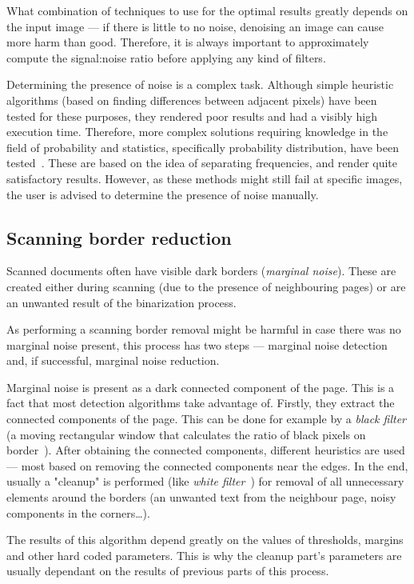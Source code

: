 What combination of techniques to use for the optimal results greatly depends on the input image --- if there is little to no noise, denoising an image can cause more harm than good. Therefore, it is always important to approximately compute the signal:noise ratio before applying any kind of filters.

Determining the presence of noise is a complex task. Although simple heuristic algorithms (based on finding differences between adjacent pixels) have been tested for these purposes, they rendered poor results and had a visibly high execution time. Therefore, more complex solutions requiring knowledge in the field of probability and statistics, specifically probability distribution, have been tested~\citep{noiseDetection}. These are based on the idea of separating frequencies, and render quite satisfactory results. However, as these methods might still fail at specific images, the user is advised to determine the presence of noise manually.

\subsection{Scanning border reduction}

Scanned documents often have visible dark borders (\emph{marginal noise}). These are created either during scanning (due to the presence of neighbouring pages) or are an unwanted result of the binarization process.

As performing a scanning border removal might be harmful in case there was no marginal noise present, this process has two steps --- marginal noise detection and, if successful, marginal noise reduction.

Marginal noise is present as a dark connected component of the page. This is a fact that most detection algorithms take advantage of. Firstly, they extract the connected components of the page. This can be done for example by a \emph{black filter} (a moving rectangular window that calculates the ratio of black pixels on border~\citep{marginalNoiseWindow}). After obtaining the connected components, different heuristics are used --- most based on removing the connected components near the edges. In the end, usually a "cleanup" is performed (like \emph{white filter}~\citep{marginalNoiseWindow}) for removal of all unnecessary elements around the borders (an unwanted text from the neighbour page, noisy components in the corners\ldots).

The results of this algorithm depend greatly on the values of thresholds, margins and other hard coded parameters. This is why the cleanup part's parameters are usually dependant on the results of previous parts of this process.


